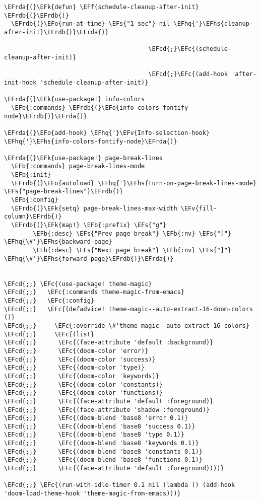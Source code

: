 \documentclass[a4wide,10pt]{article}
\newcommand{\EFc}[1]{\textcolor{EFc}{#1}} %
\newcommand{\EFcd}[1]{\textcolor{EFcd}{#1}} %
\newcommand{\EFs}[1]{\textcolor{EFs}{#1}} %
\newcommand{\EFk}[1]{\textcolor{EFk}{#1}} %
\newcommand{\EFb}[1]{\textcolor{EFb}{#1}} %
\newcommand{\EFf}[1]{\textcolor{EFf}{#1}} %
\newcommand{\EFv}[1]{\textcolor{EFv}{#1}} %
\newcommand{\EFo}[1]{\textcolor{EFo}{#1}} %
\newcommand{\EFhq}[1]{\textcolor{EFhq}{#1}} %
\newcommand{\EFhs}[1]{\textcolor{EFhs}{#1}} %
\newcommand{\EFrda}[1]{\textcolor{EFrda}{#1}} %
\newcommand{\EFrdb}[1]{\textcolor{EFrdb}{#1}} %
\begin{document}
\begin{Code}
\begin{Verbatim}
\EFrda{(}\EFk{defun} \EFf{schedule-cleanup-after-init} \EFrdb{(}\EFrdb{)}
  \EFrdb{(}\EFo{run-at-time} \EFs{"1 sec"} nil \EFhq{'}\EFhs{cleanup-after-init}\EFrdb{)}\EFrda{)}

                                        \EFcd{;}\EFc{(schedule-cleanup-after-init)}

                                        \EFcd{;}\EFc{(add-hook 'after-init-hook 'schedule-cleanup-after-init)}

\EFrda{(}\EFk{use-package!} info-colors
  \EFb{:commands} \EFrdb{(}\EFo{info-colors-fontify-node}\EFrdb{)}\EFrda{)}

\EFrda{(}\EFo{add-hook} \EFhq{'}\EFv{Info-selection-hook} \EFhq{'}\EFhs{info-colors-fontify-node}\EFrda{)}

\EFrda{(}\EFk{use-package!} page-break-lines
  \EFb{:commands} page-break-lines-mode
  \EFb{:init}
  \EFrdb{(}\EFo{autoload} \EFhq{'}\EFhs{turn-on-page-break-lines-mode} \EFs{"page-break-lines"}\EFrdb{)}
  \EFb{:config}
  \EFrdb{(}\EFk{setq} page-break-lines-max-width \EFv{fill-column}\EFrdb{)}
  \EFrdb{(}\EFk{map!} \EFb{:prefix} \EFs{"g"}
        \EFb{:desc} \EFs{"Prev page break"} \EFb{:nv} \EFs{"["} \EFhq{\#'}\EFhs{backward-page}
        \EFb{:desc} \EFs{"Next page break"} \EFb{:nv} \EFs{"]"} \EFhq{\#'}\EFhs{forward-page}\EFrdb{)}\EFrda{)}


\EFcd{;;} \EFc{(use-package! theme-magic}
\EFcd{;;}   \EFc{:commands theme-magic-from-emacs}
\EFcd{;;}   \EFc{:config}
\EFcd{;;}   \EFc{(defadvice! theme-magic--auto-extract-16-doom-colors ()}
\EFcd{;;}     \EFc{:override \#'theme-magic--auto-extract-16-colors}
\EFcd{;;}     \EFc{(list}
\EFcd{;;}      \EFc{(face-attribute 'default :background)}
\EFcd{;;}      \EFc{(doom-color 'error)}
\EFcd{;;}      \EFc{(doom-color 'success)}
\EFcd{;;}      \EFc{(doom-color 'type)}
\EFcd{;;}      \EFc{(doom-color 'keywords)}
\EFcd{;;}      \EFc{(doom-color 'constants)}
\EFcd{;;}      \EFc{(doom-color 'functions)}
\EFcd{;;}      \EFc{(face-attribute 'default :foreground)}
\EFcd{;;}      \EFc{(face-attribute 'shadow :foreground)}
\EFcd{;;}      \EFc{(doom-blend 'base8 'error 0.1)}
\EFcd{;;}      \EFc{(doom-blend 'base8 'success 0.1)}
\EFcd{;;}      \EFc{(doom-blend 'base8 'type 0.1)}
\EFcd{;;}      \EFc{(doom-blend 'base8 'keywords 0.1)}
\EFcd{;;}      \EFc{(doom-blend 'base8 'constants 0.1)}
\EFcd{;;}      \EFc{(doom-blend 'base8 'functions 0.1)}
\EFcd{;;}      \EFc{(face-attribute 'default :foreground))))}

\EFcd{;;} \EFc{(run-with-idle-timer 0.1 nil (lambda () (add-hook 'doom-load-theme-hook 'theme-magic-from-emacs)))}


\end{Verbatim}
\end{Code}
\end{document}
